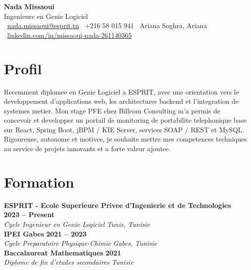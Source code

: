 \documentclass[10pt,a4paper]{article}
\newcommand{\entry}[4]{
    \textbf{#1} \hfill \textbf{#2}\\
    \textit{#3} \hfill \textit{#4}\\
}
\begin{document}
\begin{center}
    {\Huge \textbf{Nada Missaoui}}\\[3pt]
    {\large Ingenieure en Genie Logiciel}\\[6pt]
    \faEnvelope\ \href{mailto:nada.missaoui@esprit.tn}{nada.missaoui@esprit.tn}
    \quad
    \faPhone\ +216 58 015 941
    \quad
    \faMapMarker*\ Ariana Soghra, Ariana\\[3pt]
    \faLinkedin\ \href{https://www.linkedin.com/in/missaoui-nada-261140365}{linkedin.com/in/missaoui-nada-261140365}
\end{center}

\section*{Profil}
Recemment diplomee en Genie Logiciel a ESPRIT, avec une orientation vers le developpement d'applications web, les architectures backend et l'integration de systemes metier.
Mon stage PFE chez Billcom Consulting m'a permis de concevoir et developper un portail de monitoring de portabilite telephonique base sur React, Spring Boot, jBPM / KIE Server, services SOAP / REST et MySQL.
Rigoureuse, autonome et motivee, je souhaite mettre mes competences techniques au service de projets innovants et a forte valeur ajoutee.

\section*{Formation}
\entry{ESPRIT - Ecole Superieure Privee d'Ingenierie et de Technologies}{2023 -- Present}
{Cycle Ingenieur en Genie Logiciel}{Tunis, Tunisie}

\entry{IPEI Gabes}{2021 -- 2023}
{Cycle Preparatoire Physique-Chimie}{Gabes, Tunisie}

\entry{Baccalaureat Mathematiques}{2021}
{Diplome de fin d'etudes secondaires}{Tunisie}
\end{document}
